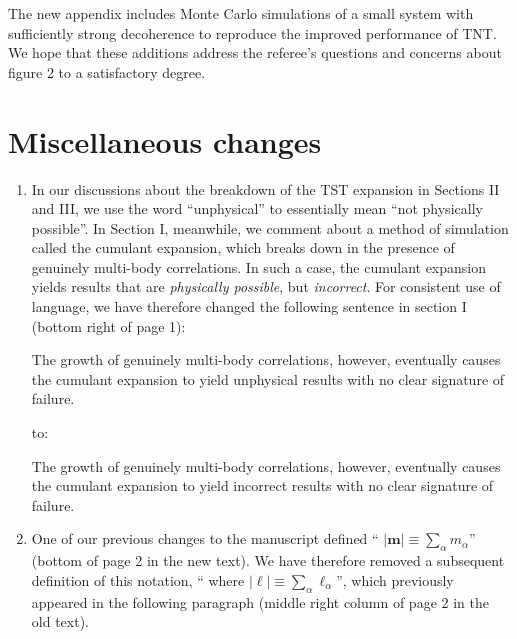 \documentclass[preprint,superscriptaddress]{revtex4-2}
\renewcommand{\v}{\bm} %
\renewcommand{\abs}[1]{\lvert #1 \rvert}
\newcommand{\1}{\mathds{1}}
\newcommand{\red}[1]{{\color{red} #1}}
\newcommand{\green}[1]{{\color{ForestGreen} #1}}
\begin{document}
\begin{enumerate}
  The new appendix includes Monte Carlo simulations of a small system
  with sufficiently strong decoherence to reproduce the improved
  performance of TNT.  We hope that these additions address the
  referee's questions and concerns about figure 2 to a satisfactory
  degree.


\end{enumerate}

\section{Miscellaneous changes}

\begin{enumerate}
\item In our discussions about the breakdown of the TST expansion in
  Sections II and III, we use the word ``unphysical'' to essentially
  mean ``not physically possible''.  In Section I, meanwhile, we
  comment about a method of simulation called the cumulant expansion,
  which breaks down in the presence of genuinely multi-body
  correlations.  In such a case, the cumulant expansion yields results
  that are {\it physically possible}, but {\it incorrect}.  For
  consistent use of language, we have therefore changed the following
  sentence in section I (bottom right of page 1):

  \red{The growth of genuinely multi-body correlations, however,
    eventually causes the cumulant expansion to yield unphysical
    results with no clear signature of failure.}

  to:

  \green{The growth of genuinely multi-body correlations, however,
    eventually causes the cumulant expansion to yield incorrect
    results with no clear signature of failure.}


\item One of our previous changes to the manuscript defined
  ``\green{$\abs{\v m}\equiv\sum_\alpha m_\alpha$}'' (bottom of page 2
  in the new text).  We have therefore removed a subsequent definition
  of this notation, ``\red{where
    $\abs{\v\ell}\equiv\sum_\alpha\ell_\alpha$}'', which previously
  appeared in the following paragraph (middle right column of page 2
  in the old text).

\end{enumerate}
\end{document}
